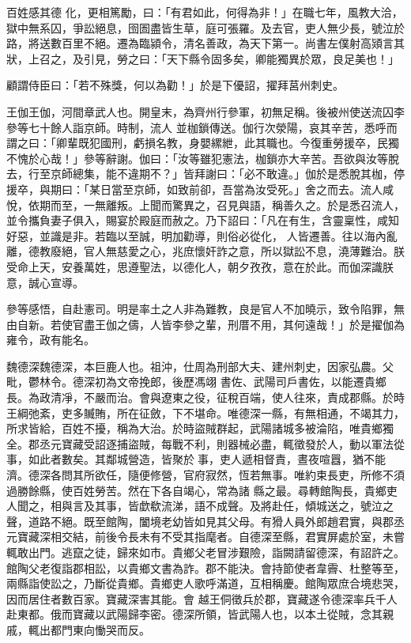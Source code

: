 \begin{pinyinscope}
 百姓感其德
 化，更相篤勵，曰：「有君如此，何得為非！」在職七年，風教大洽，獄中無系囚，爭訟絕息，囹圄盡皆生草，庭可張羅。及去官，吏人無少長，號泣於路，將送數百里不絕。遷為臨潁令，清名善政，為天下第一。尚書左僕射高熲言其狀，上召之，及引見，勞之曰：「天下縣令固多矣，卿能獨異於眾，良足美也！」



 顧謂侍臣曰：「若不殊獎，何以為勸！」於是下優詔，擢拜莒州刺史。



 王伽王伽，河間章武人也。開皇末，為齊州行參軍，初無足稱。後被州使送流囚李參等七十餘人詣京師。時制，流人
 並枷鎖傳送。伽行次滎陽，哀其辛苦，悉呼而謂之曰：「卿輩既犯國刑，虧損名教，身嬰縲紲，此其職也。今復重勞援卒，民獨不愧於心哉！」參等辭謝。伽曰：「汝等雖犯憲法，枷鎖亦大辛苦。吾欲與汝等脫去，行至京師總集，能不違期不？」皆拜謝曰：「必不敢違。」伽於是悉脫其枷，停援卒，與期曰：「某日當至京師，如致前卻，吾當為汝受死。」舍之而去。流人咸悅，依期而至，一無離叛。上聞而驚異之，召見與語，稱善久之。於是悉召流人，並令攜負妻子俱入，賜宴於殿庭而赦之。乃下詔曰：「凡在有生，含靈稟性，咸知好惡，並識是非。若臨以至誠，明加勸導，則俗必從化，
 人皆遷善。往以海內亂離，德教廢絕，官人無慈愛之心，兆庶懷奸詐之意，所以獄訟不息，澆薄難治。朕受命上天，安養萬姓，思遵聖法，以德化人，朝夕孜孜，意在於此。而伽深識朕意，誠心宣導。



 參等感悟，自赴憲司。明是率土之人非為難教，良是官人不加曉示，致令陷罪，無由自新。若使官盡王伽之儔，人皆李參之輩，刑厝不用，其何遠哉！」於是擢伽為雍令，政有能名。



 魏德深魏德深，本巨鹿人也。祖沖，仕周為刑部大夫、建州刺史，因家弘農。父毗，鬱林令。德深初為文帝挽郎，後歷馮翊
 書佐、武陽司戶書佐，以能遷貴鄉長。為政清凈，不嚴而治。會與遼東之役，征稅百端，使人往來，責成郡縣。於時王綱弛紊，吏多贓賄，所在征斂，下不堪命。唯德深一縣，有無相通，不竭其力，所求皆給，百姓不擾，稱為大治。於時盜賊群起，武陽諸城多被淪陷，唯貴鄉獨全。郡丞元寶藏受詔逐捕盜賊，每戰不利，則器械必盡，輒徵發於人，動以軍法從事，如此者數矣。其鄰城營造，皆聚於事，吏人遞相督責，晝夜喧囂，猶不能濟。德深各問其所欲任，隨便修營，官府寂然，恆若無事。唯約束長吏，所修不須過勝餘縣，使百姓勞苦。然在下各自竭心，常為諸
 縣之最。尋轉館陶長，貴鄉吏人聞之，相與言及其事，皆歔欷流涕，語不成聲。及將赴任，傾城送之，號泣之聲，道路不絕。既至館陶，闔境老幼皆如見其父母。有猾人員外郎趙君實，與郡丞元寶藏深相交結，前後令長未有不受其指麾者。自德深至縣，君實屏處於室，未嘗輒敢出門。逃竄之徒，歸來如市。貴鄉父老冒涉艱險，詣闕請留德深，有詔許之。館陶父老復詣郡相訟，以貴鄉文書為詐。郡不能決。會持節使者韋霽、杜整等至，兩縣詣使訟之，乃斷從貴鄉。貴鄉吏人歌呼滿道，互相稱慶。館陶眾庶合境悲哭，因而居住者數百家。寶藏深害其能。會
 越王侗徵兵於郡，寶藏遂令德深率兵千人赴東都。俄而寶藏以武陽歸李密。德深所領，皆武陽人也，以本土從賊，念其親戚，輒出都門東向慟哭而反。




\end{pinyinscope}
